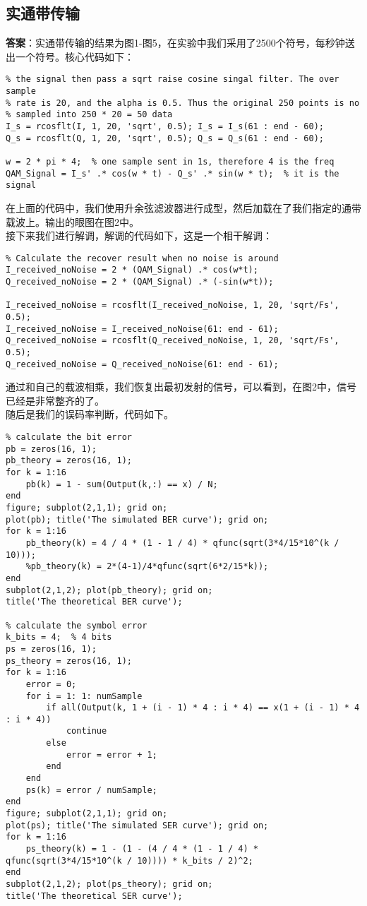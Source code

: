 \documentclass{article}
\begin{document}
\subsection{实通带传输}
\textbf{答案}：实通带传输的结果为图1-图5，在实验中我们采用了2500个符号，每秒钟送出一个符号。核心代码如下：
\begin{lstlisting}
% the signal then pass a sqrt raise cosine singal filter. The over sample 
% rate is 20, and the alpha is 0.5. Thus the original 250 points is no 
% sampled into 250 * 20 = 50 data
I_s = rcosflt(I, 1, 20, 'sqrt', 0.5); I_s = I_s(61 : end - 60);
Q_s = rcosflt(Q, 1, 20, 'sqrt', 0.5); Q_s = Q_s(61 : end - 60);

w = 2 * pi * 4;  % one sample sent in 1s, therefore 4 is the freq
QAM_Signal = I_s' .* cos(w * t) - Q_s' .* sin(w * t);  % it is the signal
\end{lstlisting}
在上面的代码中，我们使用升余弦滤波器进行成型，然后加载在了我们指定的通带载波上。输出的眼图在图2中。\\
接下来我们进行解调，解调的代码如下，这是一个相干解调：
\begin{lstlisting}
% Calculate the recover result when no noise is around
I_received_noNoise = 2 * (QAM_Signal) .* cos(w*t);
Q_received_noNoise = 2 * (QAM_Signal) .* (-sin(w*t));

I_received_noNoise = rcosflt(I_received_noNoise, 1, 20, 'sqrt/Fs', 0.5);
I_received_noNoise = I_received_noNoise(61: end - 61);
Q_received_noNoise = rcosflt(Q_received_noNoise, 1, 20, 'sqrt/Fs', 0.5);
Q_received_noNoise = Q_received_noNoise(61: end - 61);
\end{lstlisting}
通过和自己的载波相乘，我们恢复出最初发射的信号，可以看到，在图2中，信号已经是非常整齐的了。\\
随后是我们的误码率判断，代码如下。
\begin{lstlisting}
% calculate the bit error
pb = zeros(16, 1);
pb_theory = zeros(16, 1);
for k = 1:16
    pb(k) = 1 - sum(Output(k,:) == x) / N;
end
figure; subplot(2,1,1); grid on;
plot(pb); title('The simulated BER curve'); grid on;
for k = 1:16
    pb_theory(k) = 4 / 4 * (1 - 1 / 4) * qfunc(sqrt(3*4/15*10^(k / 10)));
    %pb_theory(k) = 2*(4-1)/4*qfunc(sqrt(6*2/15*k));
end
subplot(2,1,2); plot(pb_theory); grid on;
title('The theoretical BER curve');

% calculate the symbol error
k_bits = 4;  % 4 bits
ps = zeros(16, 1);
ps_theory = zeros(16, 1);
for k = 1:16
    error = 0;
    for i = 1: 1: numSample
        if all(Output(k, 1 + (i - 1) * 4 : i * 4) == x(1 + (i - 1) * 4 : i * 4))
            continue
        else
            error = error + 1;
        end
    end
    ps(k) = error / numSample;
end
figure; subplot(2,1,1); grid on;
plot(ps); title('The simulated SER curve'); grid on;
for k = 1:16
    ps_theory(k) = 1 - (1 - (4 / 4 * (1 - 1 / 4) * qfunc(sqrt(3*4/15*10^(k / 10)))) * k_bits / 2)^2;
end
subplot(2,1,2); plot(ps_theory); grid on;
title('The theoretical SER curve');
\end{lstlisting}
\end{document}
